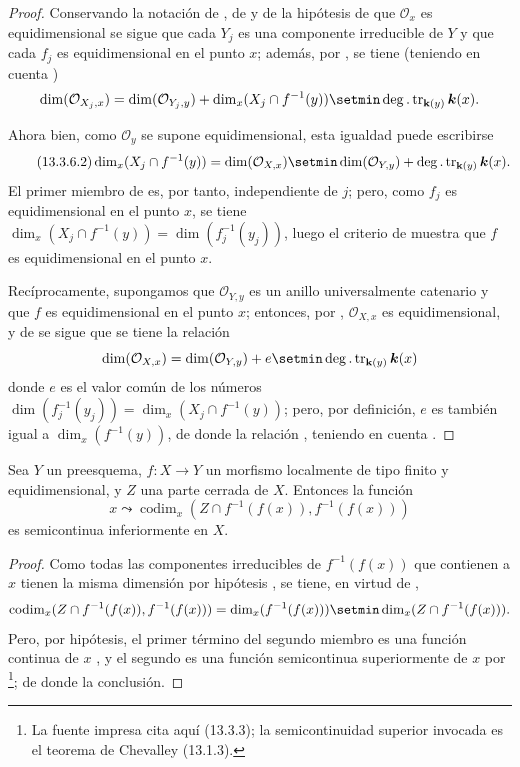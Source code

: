 \begin{proof}
Conservando la notación de , de  y de la hipótesis de que $\mathcal O_x$ es equidimensional se sigue que cada $Y_j$ es una componente irreducible de $Y$ y que cada $f_j$ es equidimensional en el punto $x$; además, por , se tiene (teniendo en cuenta )
\[
  \dim(\mathcal O_{X_j,x})=\dim(\mathcal O_{Y_j,y})
  +\dim_x(X_j\cap f^{-1}(y))\setmin\deg.\operatorname{tr}_{\mathbf{k}(y)}\boldsymbol{k}(x).
\]


Ahora bien, como $\mathcal O_y$ se supone equidimensional, esta igualdad puede escribirse
\[
\tag{13.3.6.2}
\label{IV.13.3.6.2-fr}
  \dim_x(X_j\cap f^{-1}(y))=\dim(\mathcal O_{X,x})
  \setmin\dim(\mathcal O_{Y,y})+\deg.\operatorname{tr}_{\mathbf{k}(y)}\boldsymbol{k}(x).
\]
El primer miembro de  es, por tanto, independiente de $j$; pero, como $f_j$ es equidimensional en el punto $x$, se tiene $\dim_x(X_j\cap f^{-1}(y))=\dim(f_j^{-1}(y_j))$, luego el criterio de  muestra que $f$ es equidimensional en el punto $x$.

Recíprocamente, supongamos que $\mathcal O_{Y,y}$ es un anillo universalmente catenario y que $f$ es equidimensional en el punto $x$; entonces, por , $\mathcal O_{X,x}$ es equidimensional, y de  se sigue que se tiene la relación
\[
  \dim(\mathcal O_{X,x})=\dim(\mathcal O_{Y,y})+e
  \setmin\deg.\operatorname{tr}_{\mathbf{k}(y)}\boldsymbol{k}(x)
\]
donde $e$ es el valor común de los números $\dim(f_j^{-1}(y_j))=\dim_x(X_j\cap f^{-1}(y))$; pero, por definición, $e$ es también igual a $\dim_x(f^{-1}(y))$, de donde la relación , teniendo en cuenta .
\end{proof}

\begin{proposition}[13.3.7]
\label{IV.13.3.7}
Sea $Y$ un preesquema, $f:X\to Y$ un morfismo localmente de tipo finito y equidimensional, y $Z$ una parte cerrada de $X$.
Entonces la función
\[
\tag{13.3.7.1}
\label{IV.13.3.7.1-fr}
  x\leadsto\operatorname{codim}_x
  (Z\cap f^{-1}(f(x)),f^{-1}(f(x)))
\]
es semicontinua inferiormente en $X$.
\end{proposition}

\begin{proof}
Como todas las componentes irreducibles de $f^{-1}(f(x))$ que contienen a $x$ tienen la misma dimensión por hipótesis , se tiene, en virtud de ,
\[
  \operatorname{codim}_x(Z\cap f^{-1}(f(x)),f^{-1}(f(x)))
  =\dim_x(f^{-1}(f(x)))\setmin\dim_x(Z\cap f^{-1}(f(x))).
\]
Pero, por hipótesis, el primer término del segundo miembro es una función continua de $x$ , y el segundo es una función semicontinua superiormente de $x$ por \footnote{La fuente impresa cita aquí (13.3.3); la semicontinuidad superior invocada es el teorema de Chevalley (13.1.3).}; de donde la conclusión.
\end{proof}

